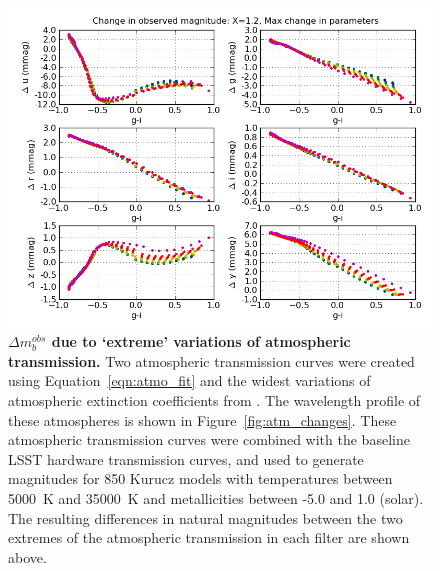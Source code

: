 \documentclass[12pt,preprint]{aastex}
\begin{document}
\begin{figure}
\centering
\includegraphics[width=6in]{delta_mags_max}
\caption{{\small
{\bf$\Delta m_b^{obs}$ due to `extreme' variations of 
atmospheric transmission.} Two atmospheric transmission curves were 
created using Equation~\ref{eqn:atmo_fit} and the widest variations of
atmospheric extinction coefficients from \citet{Burke2010b}. The wavelength
profile of these atmospheres is shown in Figure~\ref{fig:atm_changes}. 
These atmospheric transmission curves were combined with the baseline LSST 
hardware transmission curves, and used to generate magnitudes for 850 Kurucz
models with temperatures between 5000~K and 35000~K and metallicities between
-5.0 and 1.0 (solar). The resulting differences in natural magnitudes between 
the two extremes of the atmospheric transmission in each filter are shown above. 
}}
\label{fig:dmag_atm_max}
\end{figure}
\end{document}
